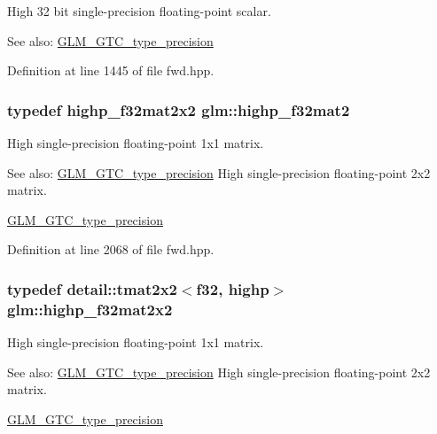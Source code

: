 High 32 bit single-precision floating-point scalar. \begin{Desc}
\item[See also:]\hyperlink{group__gtc__type__precision}{GLM\_\-GTC\_\-type\_\-precision} \end{Desc}


Definition at line 1445 of file fwd.hpp.\hypertarget{group__gtc__type__precision_ged934f561aaf8ad891c0a8f5e719aea8}{
\subsubsection[highp\_\-f32mat2]{\setlength{\rightskip}{0pt plus 5cm}typedef highp\_\-f32mat2x2 {\bf glm::highp\_\-f32mat2}}}
\label{group__gtc__type__precision_ged934f561aaf8ad891c0a8f5e719aea8}


High single-precision floating-point 1x1 matrix. \begin{Desc}
\item[See also:]\hyperlink{group__gtc__type__precision}{GLM\_\-GTC\_\-type\_\-precision} High single-precision floating-point 2x2 matrix. 

\hyperlink{group__gtc__type__precision}{GLM\_\-GTC\_\-type\_\-precision} \end{Desc}


Definition at line 2068 of file fwd.hpp.\hypertarget{group__gtc__type__precision_gf3a2cc948ca6fd168391138ce6fdd100}{
\subsubsection[highp\_\-f32mat2x2]{\setlength{\rightskip}{0pt plus 5cm}typedef detail::tmat2x2$<$f32, highp$>$ {\bf glm::highp\_\-f32mat2x2}}}
\label{group__gtc__type__precision_gf3a2cc948ca6fd168391138ce6fdd100}


High single-precision floating-point 1x1 matrix. \begin{Desc}
\item[See also:]\hyperlink{group__gtc__type__precision}{GLM\_\-GTC\_\-type\_\-precision} High single-precision floating-point 2x2 matrix. 

\hyperlink{group__gtc__type__precision}{GLM\_\-GTC\_\-type\_\-precision} \end{Desc}


